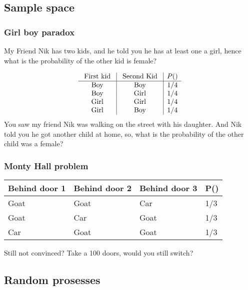 \documentclass[a4paper,12pt]{article}
\begin{document}
\subsection{Sample space}
\label{sec:org5ea3324}
\subsubsection{Girl boy paradox}
\label{sec:orgb44c9a2}
My Friend Nik has two kids, and he told you he has at least one a girl, hence what is the probability of the other kid is female?

\begin{equation*}
\begin{array}{c|c | c}
{\text { First kid }} & {\text { Second Kid }} &P() \\ 
\hline \text { Boy } & {\text { Boy }} &1/4  \\
 {\text { Boy }} & {\text { Girl }}    &1/4  \\ 
{\text { Girl }} & {\text { Girl }}    &1/4  \\ 
{\text { Girl }} & {\text { Boy }}     &1/4
\end{array}
\end{equation*}
You saw my friend Nik was walking on the street with his daughter. And Nik told you he got another child at home, so, what is the probability of the other child was a female?

\subsubsection{Monty Hall problem}
\label{sec:orgceac5c1}
\begin{table}[h!]
\centering
\begin{tabular}{l |l |l |l}
Behind door 1 & Behind door 2 & Behind door 3 & P() \\
\hline
Goat          & Goat          & Car           & 1/3 \\
Goat          & Car           & Goat          & 1/3 \\
Car           & Goat          & Goat          & 1/3
\end{tabular}
\end{table}


Still not convinced? Take a 100 doors, would you still switch?


\subsection{Random prosesses}
\label{sec:orgee9c09e}
\end{document}
